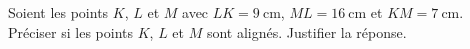 
\begin{exercice}\label{exosmath-0921}

    Soient les points \( K\), \( L\) et \( M\) avec \( LK=\SI{9}{\centi\meter}\), \( ML=\SI{16}{\centi\meter}\) et \( KM=\SI{7}{\centi\meter}\). Préciser si les points \( K\), \( L\) et \( M\) sont alignés. Justifier la réponse.

\end{exercice}
